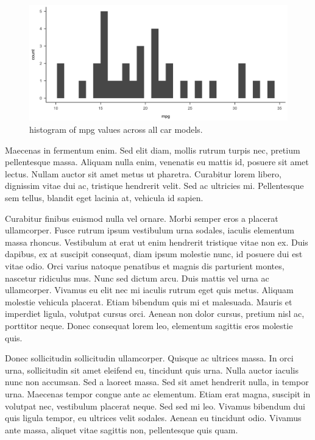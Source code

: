 \documentclass[
  english,
  man,floatsintext]{apa6}
\begin{document}
\begin{figure}

{\centering \includegraphics[width=0.75\linewidth]{figures/mpg-histogram} 

}

\caption{histogram of mpg values across all car models.}\label{fig:fig-mpghist}
\end{figure}

Maecenas in fermentum enim. Sed elit diam, mollis rutrum turpis nec, pretium pellentesque massa. Aliquam nulla enim, venenatis eu mattis id, posuere sit amet lectus. Nullam auctor sit amet metus ut pharetra. Curabitur lorem libero, dignissim vitae dui ac, tristique hendrerit velit. Sed ac ultricies mi. Pellentesque sem tellus, blandit eget lacinia at, vehicula id sapien.

Curabitur finibus euismod nulla vel ornare. Morbi semper eros a placerat ullamcorper. Fusce rutrum ipsum vestibulum urna sodales, iaculis elementum massa rhoncus. Vestibulum at erat ut enim hendrerit tristique vitae non ex. Duis dapibus, ex at suscipit consequat, diam ipsum molestie nunc, id posuere dui est vitae odio. Orci varius natoque penatibus et magnis dis parturient montes, nascetur ridiculus mus. Nunc sed dictum arcu. Duis mattis vel urna ac ullamcorper. Vivamus eu elit nec mi iaculis rutrum eget quis metus. Aliquam molestie vehicula placerat. Etiam bibendum quis mi et malesuada. Mauris et imperdiet ligula, volutpat cursus orci. Aenean non dolor cursus, pretium nisl ac, porttitor neque. Donec consequat lorem leo, elementum sagittis eros molestie quis.

Donec sollicitudin sollicitudin ullamcorper. Quisque ac ultrices massa. In orci urna, sollicitudin sit amet eleifend eu, tincidunt quis urna. Nulla auctor iaculis nunc non accumsan. Sed a laoreet massa. Sed sit amet hendrerit nulla, in tempor urna. Maecenas tempor congue ante ac elementum. Etiam erat magna, suscipit in volutpat nec, vestibulum placerat neque. Sed sed mi leo. Vivamus bibendum dui quis ligula tempor, eu ultrices velit sodales. Aenean eu tincidunt odio. Vivamus ante massa, aliquet vitae sagittis non, pellentesque quis quam.
\end{document}
